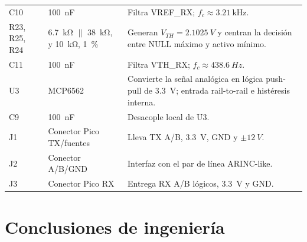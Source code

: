 \documentclass[11pt,a4paper]{article}
\begin{document}
\begin{longtable}{@{}p{28mm}p{23mm}p{109mm}@{}}
C10 & \SI{100}{\nano\farad} & Filtra VREF\_RX; $f_c\approx\SI{3.21}{\kilo\hertz}$. \\
R23, R25, R24 & \SI{6.7}{\kilo\ohm} $\parallel$ \SI{38}{\kilo\ohm}, y \SI{10}{\kilo\ohm}, \SI{1}{\percent} & Generan $V_{TH}=\SI{2.1025}{V}$ y centran la decisión entre NULL máximo y activo mínimo. \\
C11 & \SI{100}{\nano\farad} & Filtra VTH\_RX; $f_c\approx\SI{438.6}{Hz}$. \\
U3 & MCP6562 & Convierte la señal analógica en lógica push-pull de \SI{3.3}{V}; entrada rail-to-rail e histéresis interna. \\
C9 & \SI{100}{\nano\farad} & Desacople local de U3. \\
J1 & Conector Pico TX/fuentes & Lleva TX A/B, \SI{3.3}{V}, GND y $\pm\SI{12}{V}$. \\
J2 & Conector A/B/GND & Interfaz con el par de línea ARINC-like. \\
J3 & Conector Pico RX & Entrega RX A/B lógicos, \SI{3.3}{V} y GND. \\
\bottomrule
\end{longtable}

\section{Conclusiones de ingeniería}
\end{document}
